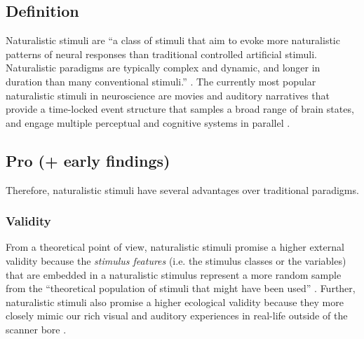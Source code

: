 \subsection{Definition}
Naturalistic stimuli are ``a class of stimuli that aim to evoke more
naturalistic patterns of neural responses than traditional controlled artificial
stimuli. Naturalistic paradigms are typically complex and dynamic, and longer in
duration than many conventional stimuli.'' \citep{vanderwal2019movies}.
The currently most popular naturalistic stimuli in neuroscience are movies and
auditory narratives \citep[cf.][for reviews]{jaaskelainen2021movies,
jaaskelainen2020neural} that provide a time-locked event structure that samples
a broad range of brain states, and engage multiple perceptual and cognitive
systems in parallel \citep{haxby2020naturalistic}.


\subsection{Pro (+ early findings)}
%
Therefore, naturalistic stimuli have several advantages over traditional
paradigms.


\subsubsection{Validity}

From a theoretical point of view, naturalistic stimuli promise a higher external
validity because the \textit{stimulus features} (i.e. the stimulus classes or
the variables) that are embedded in a naturalistic stimulus represent a more
random sample from the ``theoretical population of stimuli that might have been
used'' \citep{westfall2016fixing}.
Further, naturalistic stimuli also promise a higher ecological validity
\citep{zaki2009need, hasson2012future, hamilton2018revolution} because they more
closely mimic our rich visual and auditory experiences in real-life outside of
the scanner bore \citep{hasson2008neurocinematics, haxby2020naturalistic}.


